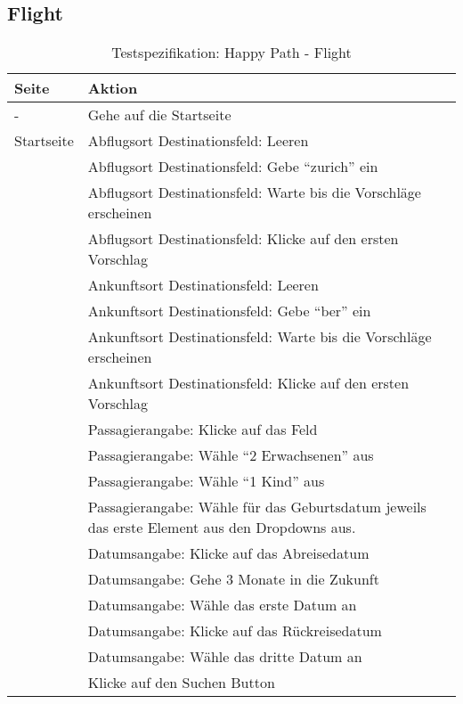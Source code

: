 \subsection{Flight}
\begin{table}[H] 
	\caption{Testspezifikation: Happy Path - Flight}
	\centering
		
	\begin{tabularx}{0.9\textwidth}{ | l | X | } 
		\hline 
		\textbf{Seite} & \textbf{Aktion} \\ \hline 
		\multirow{1}{*}{-} & Gehe auf die Startseite \\ \hline
		\multirow{1}{*}{Startseite} & Abflugsort Destinationsfeld: Leeren \\ \cline{2-2}
		& Abflugsort Destinationsfeld: Gebe "`zurich"' ein \\ \cline{2-2}
		& Abflugsort Destinationsfeld: Warte bis die Vorschläge erscheinen \\ \cline{2-2}
		& Abflugsort Destinationsfeld: Klicke auf den ersten Vorschlag \\ \cline{2-2}
		& Ankunftsort Destinationsfeld: Leeren \\ \cline{2-2}
		& Ankunftsort Destinationsfeld: Gebe "`ber"' ein \\ \cline{2-2}
		& Ankunftsort Destinationsfeld: Warte bis die Vorschläge erscheinen \\ \cline{2-2}
		& Ankunftsort Destinationsfeld: Klicke auf den ersten Vorschlag \\ \cline{2-2}
		& Passagierangabe: Klicke auf das Feld \\ \cline{2-2}
		& Passagierangabe: Wähle "`2 Erwachsenen"' aus \\ \cline{2-2}
		& Passagierangabe: Wähle "`1 Kind"' aus \\ \cline{2-2}
		& Passagierangabe: Wähle für das Geburtsdatum jeweils das erste Element aus den Dropdowns aus.  \\ \cline{2-2}
		& Datumsangabe: Klicke auf das Abreisedatum \\ \cline{2-2}
		& Datumsangabe: Gehe 3 Monate in die Zukunft \\ \cline{2-2}
		& Datumsangabe: Wähle das erste Datum an \\ \cline{2-2}
		& Datumsangabe: Klicke auf das Rückreisedatum \\ \cline{2-2}
		& Datumsangabe: Wähle das dritte Datum an \\ \cline{2-2}
		& Klicke auf den Suchen Button \\ \hline
				

\end{tabularx}
\end{table}
